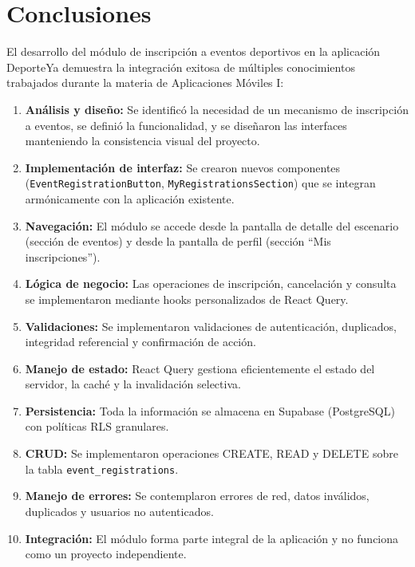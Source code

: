 \documentclass[12pt,letterpaper]{article}
\newcommand{\textoEncabezado}[2]{%
  \parbox{\headwidth}{\raggedleft
    \setstretch{1}%
    \textbf{#1}%
    \\[-6pt]{\rule{\headwidth}{0.4pt}}%
    \if\relax\detokenize{#2}\relax\else\\[2pt]\textbf{#2}\fi
  }%
}
\newcommand{\encabezadoCapitulo}[2]{%
  \fancyhead[C]{\textoEncabezado{#1}{#2}}%
}
\newcommand{\nombreApp}{DeporteYa}
\begin{document}
\newpage
\encabezadoCapitulo{CONCLUSIONES}{}

\section{Conclusiones}

El desarrollo del m\'odulo de inscripci\'on a eventos deportivos en
la aplicaci\'on \nombreApp{} demuestra la integraci\'on exitosa de
m\'ultiples conocimientos trabajados durante la materia de
Aplicaciones M\'oviles I:

\begin{enumerate}
  \item \textbf{An\'alisis y dise\~no:} Se identific\'o la necesidad
    de un mecanismo de inscripci\'on a eventos, se defini\'o la
    funcionalidad, y se dise\~naron las interfaces manteniendo la
    consistencia visual del proyecto.

  \item \textbf{Implementaci\'on de interfaz:} Se crearon nuevos
    componentes (\texttt{EventRegistrationButton},
    \texttt{MyRegistrationsSection}) que se integran
    arm\'onicamente con la aplicaci\'on existente.

  \item \textbf{Navegaci\'on:} El m\'odulo se accede desde la
    pantalla de detalle del escenario (secci\'on de eventos) y
    desde la pantalla de perfil (secci\'on ``Mis inscripciones'').

  \item \textbf{L\'ogica de negocio:} Las operaciones de
    inscripci\'on, cancelaci\'on y consulta se implementaron
    mediante hooks personalizados de React Query.

  \item \textbf{Validaciones:} Se implementaron validaciones de
    autenticaci\'on, duplicados, integridad referencial y
    confirmaci\'on de acci\'on.

  \item \textbf{Manejo de estado:} React Query gestiona
    eficientemente el estado del servidor, la cach\'e y la
    invalidaci\'on selectiva.

  \item \textbf{Persistencia:} Toda la informaci\'on se almacena
    en Supabase (PostgreSQL) con pol\'iticas RLS granulares.

  \item \textbf{CRUD:} Se implementaron operaciones CREATE, READ
    y DELETE sobre la tabla \texttt{event\_registrations}.

  \item \textbf{Manejo de errores:} Se contemplaron errores de
    red, datos inv\'alidos, duplicados y usuarios no
    autenticados.

  \item \textbf{Integraci\'on:} El m\'odulo forma parte
    integral de la aplicaci\'on y no funciona como un proyecto
    independiente.
\end{enumerate}
\end{document}
